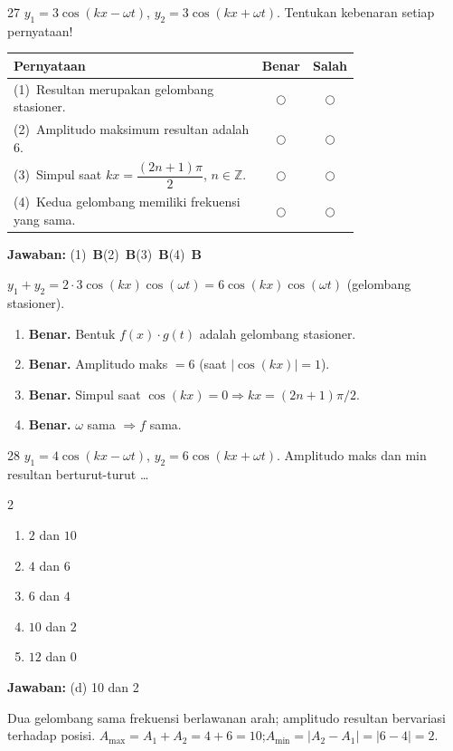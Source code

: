 \documentclass[11pt]{article}
\newcommand{\jawaban}[1]{%
  \noindent\colorbox{gold!30}{\parbox{\dimexpr\linewidth-2\fboxsep\relax}{%
    \textbf{Jawaban:} #1}}\par\smallskip}
\newenvironment{pilB}{%
  \par\smallskip\begin{multicols}{2}
  \begin{enumerate}[label=(\alph*),leftmargin=*,itemsep=1pt,topsep=3pt]}%
  {\end{enumerate}\end{multicols}}
\begin{document}
\begin{soal}{27}
$y_1=3\cos(kx-\omega t)$, $y_2=3\cos(kx+\omega t)$.
Tentukan kebenaran setiap pernyataan!

\par\smallskip
{\renewcommand{\arraystretch}{1.4}%
\begin{tabular}{@{}p{0.76\linewidth}cc@{}}
\hline\textbf{Pernyataan}&\textbf{Benar}&\textbf{Salah}\\\hline
(1)~Resultan merupakan gelombang stasioner.&$\bigcirc$&$\bigcirc$\\
(2)~Amplitudo maksimum resultan adalah 6.&$\bigcirc$&$\bigcirc$\\
(3)~Simpul saat $kx=\dfrac{(2n+1)\pi}{2}$, $n\in\mathbb{Z}$.&$\bigcirc$&$\bigcirc$\\
(4)~Kedua gelombang memiliki frekuensi yang sama.&$\bigcirc$&$\bigcirc$\\\hline
\end{tabular}}
\end{soal}
\begin{pembox}
\jawaban{(1)~\textbf{B}\quad(2)~\textbf{B}\quad(3)~\textbf{B}\quad(4)~\textbf{B}}
$y_1+y_2=2\cdot3\cos(kx)\cos(\omega t)=6\cos(kx)\cos(\omega t)$ (gelombang stasioner).
\begin{enumerate}[leftmargin=*,topsep=2pt,itemsep=2pt]
\item \textbf{Benar.} Bentuk $f(x)\cdot g(t)$ adalah gelombang stasioner.
\item \textbf{Benar.} Amplitudo maks $=6$ (saat $|\cos(kx)|=1$).
\item \textbf{Benar.} Simpul saat $\cos(kx)=0\Rightarrow kx=(2n+1)\pi/2$.
\item \textbf{Benar.} $\omega$ sama $\Rightarrow f$ sama.
\end{enumerate}
\end{pembox}

\begin{soal}{28}
$y_1=4\cos(kx-\omega t)$, $y_2=6\cos(kx+\omega t)$.
Amplitudo maks dan min resultan berturut-turut \ldots
\begin{pilB}
  \item $2$ dan $10$ \item $4$ dan $6$ \item $6$ dan $4$
  \item $10$ dan $2$ \item $12$ dan $0$
\end{pilB}
\end{soal}
\begin{pembox}
\jawaban{(d) 10 dan 2}
Dua gelombang sama frekuensi berlawanan arah; amplitudo resultan bervariasi terhadap posisi.
$A_{\max}=A_1+A_2=4+6=10$;\quad$A_{\min}=|A_2-A_1|=|6-4|=2$.
\end{pembox}
\end{document}
